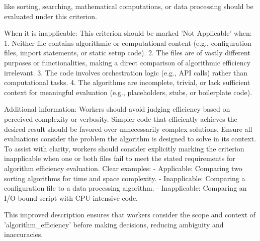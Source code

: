 \begin{tcolorbox}
    like sorting, searching, mathematical computations, or data processing
    should be evaluated under this criterion. \par When it is inapplicable: This
    criterion should be marked 'Not Applicable' when: 1. Neither file contains algorithmic
    or computational content (e.g., configuration files, import statements, or
    static setup code). 2. The files are of vastly different purposes or
    functionalities, making a direct comparison of algorithmic efficiency irrelevant.
    3. The code involves orchestration logic (e.g., API calls) rather than
    computational tasks. 4. The algorithms are incomplete, trivial, or lack sufficient
    context for meaningful evaluation (e.g., placeholders, stubs, or boilerplate
    code).\par Additional information: Workers should avoid judging efficiency
    based on perceived complexity or verbosity. Simpler code that efficiently achieves
    the desired result should be favored over unnecessarily complex solutions.
    Ensure all evaluations consider the problem the algorithm is designed to
    solve in its context. To assist with clarity, workers should consider
    explicitly marking the criterion inapplicable when one or both files fail to
    meet the stated requirements for algorithm efficiency evaluation. Clear examples:
    - Applicable: Comparing two sorting algorithms for time and space complexity.
    - Inapplicable: Comparing a configuration file to a data processing algorithm.
    - Inapplicable: Comparing an I/O-bound script with CPU-intensive code.\par This
    improved description ensures that workers consider the scope and context of 'algorithm\_efficiency'
    before making decisions, reducing ambiguity and inaccuracies.
\end{tcolorbox}

